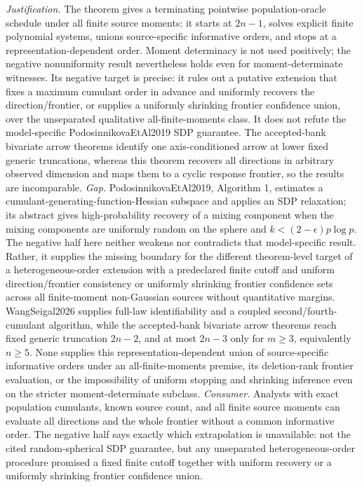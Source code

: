 \documentclass{article}
\begin{document}
\par\smallskip\noindent \textit{Justification.} The theorem gives a terminating pointwise population-oracle schedule under all finite source moments: it starts at \(2n-1\), solves explicit finite polynomial systems, unions source-specific informative orders, and stops at a representation-dependent order. Moment determinacy is not used positively; the negative nonuniformity result nevertheless holds even for moment-determinate witnesses. Its negative target is precise: it rules out a putative extension that fixes a maximum cumulant order in advance and uniformly recovers the direction/frontier, or supplies a uniformly shrinking frontier confidence union, over the unseparated qualitative all-finite-moments class. It does not refute the model-specific PodosinnikovaEtAl2019 SDP guarantee. The accepted-bank bivariate arrow theorems identify one axis-conditioned arrow at lower fixed generic truncations, whereas this theorem recovers all directions in arbitrary observed dimension and maps them to a cyclic response frontier, so the results are incomparable. \textit{Gap.} PodosinnikovaEtAl2019, Algorithm 1, estimates a cumulant-generating-function-Hessian subspace and applies an SDP relaxation; its abstract gives high-probability recovery of a mixing component when the mixing components are uniformly random on the sphere and \(k<(2-\epsilon)p\log p\). The negative half here neither weakens nor contradicts that model-specific result. Rather, it supplies the missing boundary for the different theorem-level target of a heterogeneous-order extension with a predeclared finite cutoff and uniform direction/frontier consistency or uniformly shrinking frontier confidence sets across all finite-moment non-Gaussian sources without quantitative margins. WangSeigal2026 supplies full-law identifiability and a coupled second/fourth-cumulant algorithm, while the accepted-bank bivariate arrow theorems reach fixed generic truncation \(2n-2\), and at most \(2n-3\) only for \(m\ge3\), equivalently \(n\ge5\). None supplies this representation-dependent union of source-specific informative orders under an all-finite-moments premise, its deletion-rank frontier evaluation, or the impossibility of uniform stopping and shrinking inference even on the stricter moment-determinate subclass. \textit{Consumer.} Analysts with exact population cumulants, known source count, and all finite source moments can evaluate all directions and the whole frontier without a common informative order. The negative half says exactly which extrapolation is unavailable: not the cited random-spherical SDP guarantee, but any unseparated heterogeneous-order procedure promised a fixed finite cutoff together with uniform recovery or a uniformly shrinking frontier confidence union.
\end{document}
